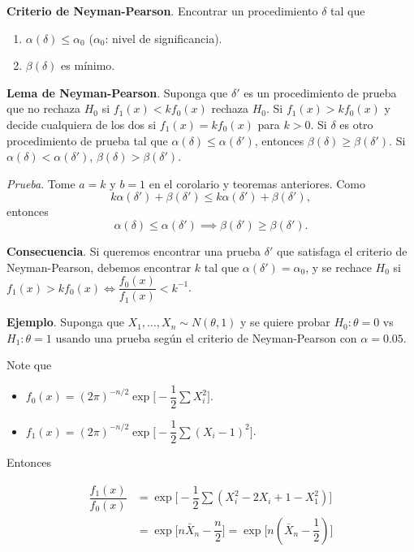 \documentclass[
  12pt,
]{book}
\providecommand{\tightlist}{%
  \setlength{\itemsep}{0pt}\setlength{\parskip}{0pt}}
\begin{document}
\textbf{Criterio de Neyman-Pearson}. Encontrar un procedimiento \(\delta\) tal que

\begin{enumerate}
\def\labelenumi{\arabic{enumi})}
\item
  \(\alpha(\delta) \leq \alpha_0\) (\(\alpha_0\): nivel de significancia).
\item
  \(\beta(\delta)\) es mínimo.
\end{enumerate}

\textbf{Lema de Neyman-Pearson}. Suponga que \(\delta'\) es un procedimiento de prueba que no rechaza \(H_0\) si \(f_1(x)<kf_0(x)\) rechaza \(H_0\). Si \(f_1(x)>kf_0(x)\) y decide cualquiera de los dos si \(f_1(x)=kf_0(x)\) para \(k>0\). Si \(\delta\) es otro procedimiento de prueba tal que \(\alpha(\delta)\leq \alpha(\delta')\), entonces \(\beta(\delta)\geq \beta(\delta')\). Si \(\alpha(\delta) <\alpha(\delta')\), \(\beta(\delta)> \beta(\delta')\).

\emph{Prueba}. Tome \(a=k\) y \(b=1\) en el corolario y teoremas anteriores. Como
\[k\alpha(\delta')+\beta(\delta')\leq k\alpha(\delta')+\beta(\delta'),\]
entonces
\[\alpha(\delta)\leq \alpha(\delta')\implies \beta(\delta')\geq \beta(\delta').\]

\textbf{Consecuencia}. Si queremos encontrar una prueba \(\delta'\) que satisfaga el criterio de Neyman-Pearson, debemos encontrar \(k\) tal que \(\alpha(\delta') = \alpha_0\), y se rechace \(H_0\) si \(f_1(x)>kf_0(x) \Leftrightarrow\dfrac{f_0(x)}{f_1(x)}<k^{-1}\).

\textbf{Ejemplo}. Suponga que \(X_1,\dots,X_n\sim N(\theta,1)\) y se quiere probar \(H_0: \theta = 0\) vs \(H_1: \theta = 1\) usando una prueba según el criterio de Neyman-Pearson con \(\alpha = 0.05\).

Note que

\begin{itemize}
\tightlist
\item
  \(f_0(x) = (2\pi)^{-n/2}\exp\bigg[-\dfrac 12 \sum X_i^2\bigg]\).
\item
  \(f_1(x) = (2\pi)^{-n/2}\exp\bigg[-\dfrac 12 \sum (X_i-1)^2\bigg]\).
\end{itemize}

Entonces

\begin{align*}
\dfrac{f_1(x)}{f_0(x)}& = \exp\bigg[-\dfrac 12 \sum (X_i^2-2X_i+1-X_1^2)\bigg]\\
& = \exp\bigg[n\bar X_n - \dfrac n2\bigg] = \exp\bigg[n\left(\bar X_n - \dfrac 12\right)\bigg] 
\end{align*}
\end{document}
